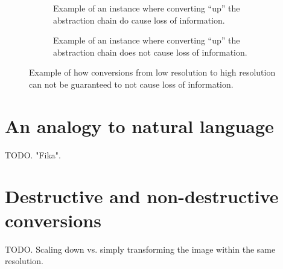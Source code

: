 \documentclass{scrreprt}
\begin{document}
\begin{figure}[h]

\begin{subfigure}{.5\textwidth}
  \centering

  \caption{Example of an instance where converting ``up'' the abstraction chain do cause loss of information.}
  \label{fig:low-to-high-resolution-destructive}
\end{subfigure}%
\begin{subfigure}{.5\textwidth}
  \centering

  \caption{Example of an instance where converting ``up'' the abstraction chain does not cause loss of information.}
  \label{fig:low-to-high-resolution-non-destructive}
\end{subfigure}

\caption{Example of how conversions from low resolution to high resolution can not be guaranteed to not cause loss of information.}
\end{figure}








\section{An analogy to natural language}
TODO. "Fika".





\section{Destructive and non-destructive conversions}
TODO. Scaling down vs. simply transforming the image within the same resolution.
\end{document}
